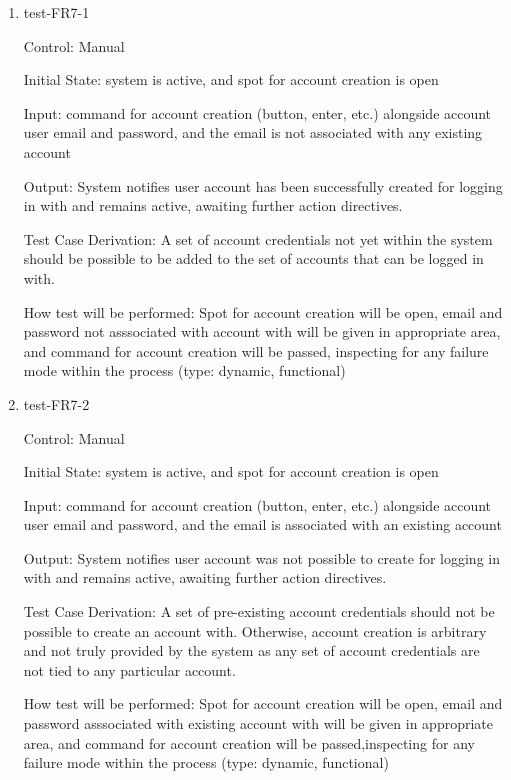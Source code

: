 \documentclass[12pt, titlepage]{article}
\begin{document}
\begin{enumerate}

\item{test-FR7-1\\}

Control: Manual
					
Initial State: system is active, and spot for account creation is open
					
Input: command for account creation (button, enter, etc.) alongside account 
user email and password, and the email is not associated with any existing 
account
					
Output: System notifies user account has been successfully created for 
logging in with and remains active, awaiting further action directives.

Test Case Derivation: A set of account credentials not yet within the system 
should be possible to be added to the set of accounts that can be logged in 
with.

How test will be performed: Spot for account creation will be open, email and 
password not asssociated with account with will be given in appropriate area, 
and command for account creation will be passed, inspecting for any failure 
mode within the process (type: dynamic, functional)

\item{test-FR7-2\\}

Control: Manual
					
Initial State: system is active, and spot for account creation is open
					
Input: command for account creation (button, enter, etc.) alongside account 
user email and password, and the email is associated with an existing 
account
					
Output: System notifies user account was not possible to create for logging 
in with and remains active, awaiting further action directives.

Test Case Derivation: A set of pre-existing account credentials should not be 
possible to create an account with. Otherwise, account creation is arbitrary 
and not truly provided by the system as any set of account credentials are not 
tied to any particular account.

How test will be performed: Spot for account creation will be open, email and 
password asssociated with existing account with will be given in appropriate 
area, and command for account creation will be passed,inspecting for any 
failure mode within the process (type: dynamic, functional)
					

\end{enumerate}
\end{document}
